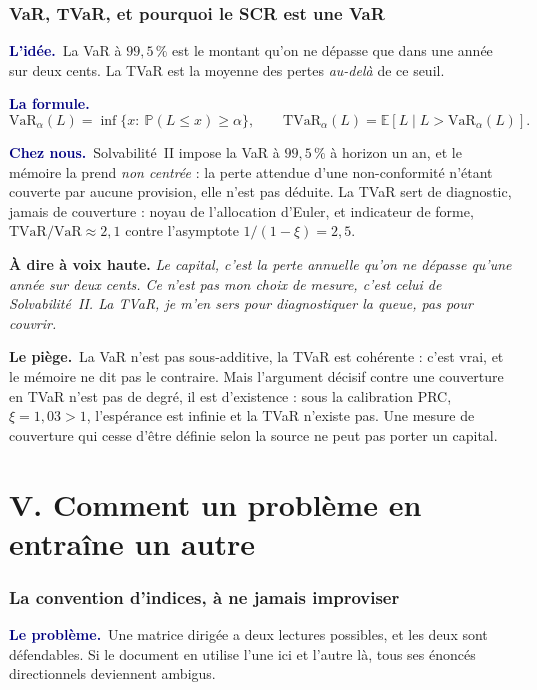 \documentclass[11pt,a4paper]{article}
\newcommand{\lequoi}[1]{\smallskip\noindent\textcolor{navy}{\textbf{Le problème.}}\ #1\par}
\newcommand{\lidee}[1]{\smallskip\noindent\textcolor{navy}{\textbf{L'idée.}}\ #1\par}
\newcommand{\laformule}[1]{\smallskip\noindent\textcolor{navy}{\textbf{La formule.}}\ #1\par}
\newcommand{\cheznous}[1]{\smallskip\noindent\textcolor{navy}{\textbf{Chez nous.}}\ #1\par}
\newcommand{\lepiege}[1]{\smallskip\noindent\textcolor{accent}{\textbf{Le piège.}}\ #1\par}
\newcommand{\laphrase}[1]{\begin{phrasebox}\textbf{À dire à voix haute.} \emph{#1}\end{phrasebox}}
\begin{document}
\section{VaR, TVaR, et pourquoi le SCR est une VaR}

\lidee{La VaR à $99{,}5\,\%$ est le montant qu'on ne dépasse que dans une année sur deux
cents. La TVaR est la moyenne des pertes \emph{au-delà} de ce seuil.}

\laformule{
\[
  \mathrm{VaR}_\alpha(L)=\inf\{x:\ \mathbb{P}(L\le x)\ge\alpha\},
  \qquad
  \mathrm{TVaR}_\alpha(L)=\mathbb{E}[L\mid L>\mathrm{VaR}_\alpha(L)].
\]}

\cheznous{Solvabilité~II impose la VaR à $99{,}5\,\%$ à horizon un an, et le mémoire la prend
\emph{non centrée} : la perte attendue d'une non-conformité n'étant couverte par aucune provision,
elle n'est pas déduite. La TVaR sert de diagnostic, jamais de couverture : noyau de l'allocation
d'Euler, et indicateur de forme, $\mathrm{TVaR}/\mathrm{VaR}\approx2{,}1$ contre l'asymptote
$1/(1-\xi)=2{,}5$.}

\laphrase{Le capital, c'est la perte annuelle qu'on ne dépasse qu'une année sur deux cents. Ce
n'est pas mon choix de mesure, c'est celui de Solvabilité~II. La TVaR, je m'en sers pour
diagnostiquer la queue, pas pour couvrir.}

\lepiege{La VaR n'est pas sous-additive, la TVaR est cohérente : c'est vrai, et le mémoire ne dit
pas le contraire. Mais l'argument décisif contre une couverture en TVaR n'est pas de degré, il est
d'existence : sous la calibration PRC, $\xi=1{,}03>1$, l'espérance est infinie et la TVaR n'existe
pas. Une mesure de couverture qui cesse d'être définie selon la source ne peut pas porter un
capital.}

\part*{V. Comment un problème en entraîne un autre}

\section{La convention d'indices, à ne jamais improviser}

\lequoi{Une matrice dirigée a deux lectures possibles, et les deux sont défendables. Si le
document en utilise l'une ici et l'autre là, tous ses énoncés directionnels deviennent
ambigus.}
\end{document}
